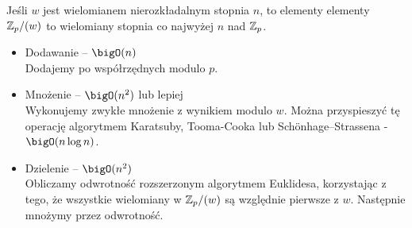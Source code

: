 Jeśli \( w \) jest wielomianem nierozkładalnym stopnia \( n \), to elementy 
elementy \( \mathbb{Z}_p/(w) \) to wielomiany stopnia co najwyżej \( n \) nad \( \mathbb{Z}_p \).
\begin{itemize}
    \item Dodawanie -- \( \bigO(n) \) \\
    Dodajemy po współrzędnych modulo \( p \).
    \item Mnożenie -- \( \bigO(n^2) \) lub lepiej \\
    Wykonujemy zwykłe mnożenie z wynikiem modulo \( w \). Można przyspieszyć tę operację algorytmem Karatsuby, Tooma-Cooka lub Sch\"onhage–Strassena - \( \bigO(n\log n) \).
    \item Dzielenie -- \( \bigO(n^2) \) \\
    Obliczamy odwrotność rozszerzonym algorytmem Euklidesa, korzystając z tego, że wszystkie wielomiany w \( \mathbb{Z}_p/(w) \) są względnie pierwsze z \( w \). Następnie mnożymy przez odwrotność.
\end{itemize}
